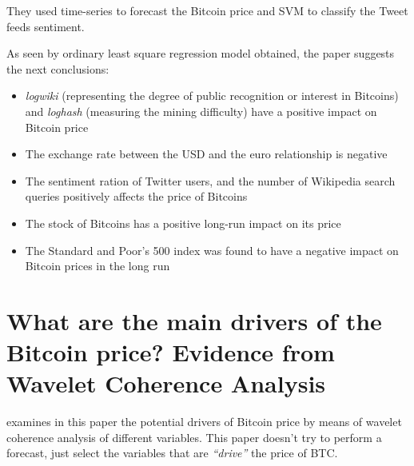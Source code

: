 They used time-series to forecast the Bitcoin price and SVM to
classify the Tweet feeds sentiment.

As seen by ordinary least square regression model obtained, the paper
suggests the next conclusions:

\begin{itemize}
\item \textit{logwiki} (representing the degree of public recognition
  or interest in Bitcoins) and \textit{loghash} (measuring the mining
  difficulty) have a positive impact on Bitcoin price 
\item The exchange rate between the USD and the euro relationship is
  negative 
\item The sentiment ration of Twitter users, and the number of
  Wikipedia search queries positively affects the price of Bitcoins
\item The stock of Bitcoins has a positive long-run impact on its
  price 
\item The Standard and Poor's 500 index was found to have a negative
  impact on Bitcoin prices in the long run
\end{itemize}


\section[\cite{kristoufek_what_2015}]{What are the main drivers of the
  Bitcoin price? Evidence from Wavelet Coherence Analysis}
\label{sec:where-are-the-main-drivers-of-the-bitcoin-price}

\cite{kristoufek_what_2015} examines in this paper the potential
drivers of Bitcoin price by means of wavelet coherence analysis of
different variables. This paper doesn't try to perform a forecast,
just select the variables that are \textit{``drive''} the price of
BTC.

